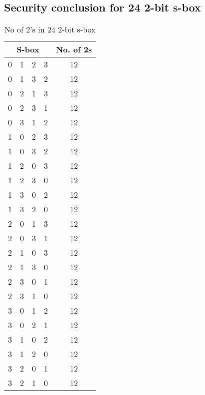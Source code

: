 \documentclass[12pt]{article}
\begin{document}
\subsection{Security conclusion for 24 2-bit s-box}
\begin{table}[H]
    \centering
    \begin{tabular}{|c|c|c|c|c|}
        \hline
        \multicolumn{4}{|c|}{S-box} & No. of 2s \\
        \hline
        0 & 1 & 2 & 3 & 12 \\
        \hline
        0 & 1 & 3 & 2 & 12 \\
        \hline
        0 & 2 & 1 & 3 & 12 \\
        \hline
        0 & 2 & 3 & 1 & 12 \\
        \hline
        0 & 3 & 1 & 2 & 12 \\
        \hline
        1 & 0 & 2 & 3 & 12 \\
        \hline
        1 & 0 & 3 & 2 & 12 \\
        \hline
        1 & 2 & 0 & 3 & 12 \\
        \hline
        1 & 2 & 3 & 0 & 12 \\
        \hline
        1 & 3 & 0 & 2 & 12 \\
        \hline
        1 & 3 & 2 & 0 & 12 \\
        \hline
        2 & 0 & 1 & 3 & 12 \\
        \hline
        2 & 0 & 3 & 1 & 12 \\
        \hline
        2 & 1 & 0 & 3 & 12 \\
        \hline
        2 & 1 & 3 & 0 & 12 \\
        \hline
        2 & 3 & 0 & 1 & 12 \\
        \hline
        2 & 3 & 1 & 0 & 12 \\
        \hline
        3 & 0 & 1 & 2 & 12 \\
        \hline
        3 & 0 & 2 & 1 & 12 \\
        \hline
        3 & 1 & 0 & 2 & 12 \\
        \hline
        3 & 1 & 2 & 0 & 12 \\
        \hline
        3 & 2 & 0 & 1 & 12 \\
        \hline
        3 & 2 & 1 & 0 & 12 \\
        \hline
    \end{tabular}
    \caption{No of 2's in 24 2-bit s-box}
    \label{sec:1}
\end{table}
\end{document}

